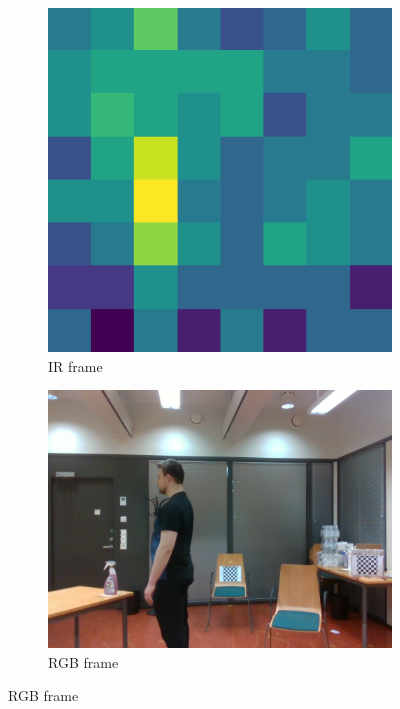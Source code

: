 \begin{figure}
    \centering
    \begin{subfigure}[t]{0.3\textwidth}
    \includegraphics[width=\textwidth]{fig/5/ir_t_7.0.png}
        \caption{IR frame}
    \end{subfigure}
    \hfill
    \begin{subfigure}[t]{0.3\textwidth}
        \includegraphics[width=\textwidth]{fig/5/rgb_t_7.0.png}
        \caption{RGB frame}

\end{subfigure}
\end{figure}
